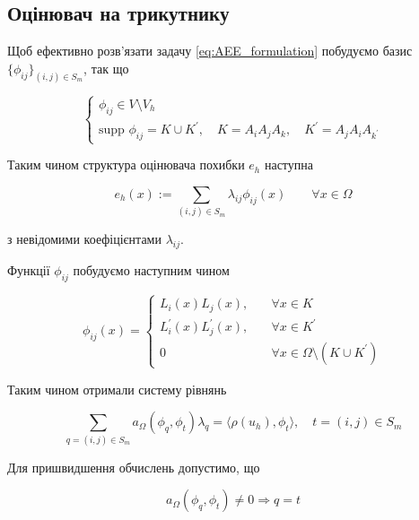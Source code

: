 
\subsection{Оцінювач на трикутнику}

Щоб ефективно розв'язати задачу
\eqref{eq:AEE_formulation} побудуємо базис $\lbrace \phi_{ij} \rbrace_{(i,j) \in S_m}$, так що

\begin{equation}\label{eq:basis_properties}
\begin{cases}
	\phi_{ij} \in V \setminus V_h \\
	\text{supp } \phi_{ij} = K \cup K^\prime, \quad K = A_iA_jA_k, \quad K^\prime = A_jA_iA_{k^\prime}
\end{cases}
\end{equation}

Таким чином структура оцінювача похибки $e_h$ наступна

\begin{equation}
	e_h(x) := \sum \limits_{(i,j) \in S_m} \lambda_{ij} \phi_{ij}(x) \qquad \forall x \in \Omega
\end{equation}

з невідомими коефіцієнтами $\lambda_{ij}$.

Функції $\phi_{ij}$ побудуємо наступним чином

\begin{equation}
	\phi_{ij}(x) =
	\begin{cases}
		L_i(x)L_j(x), &\quad \forall x \in K\\
		L_i^\prime(x)L_j^\prime(x), &\quad \forall x \in K^\prime\\
		0 &\quad \forall x \in \Omega \setminus (K \cup K^\prime)
	\end{cases}
\end{equation}


Таким чином отримали систему рівнянь

\begin{equation}\label{eq:AEE_system}
	\sum \limits_{q = (i,j) \in S_m} a_\Omega(\phi_q, \phi_t) \lambda_q = \langle \rho(u_h), \phi_t \rangle, \quad t = (i,j) \in S_m
\end{equation}

Для пришвидшення обчислень допустимо, що

\begin{equation}
	a_\Omega(\phi_q, \phi_t) \neq 0 \Rightarrow q = t
\end{equation}


